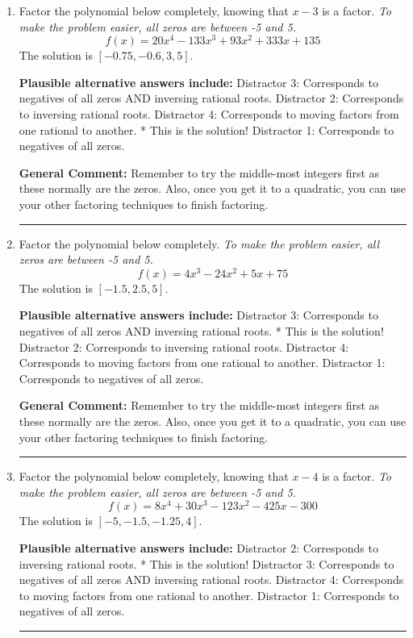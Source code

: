\documentclass{extbook}[14pt]
\newcommand{\litem}[1]{\item #1

\rule{\textwidth}{0.4pt}}
\begin{document}
\begin{enumerate}\litem{
Factor the polynomial below completely, knowing that $x -3$ is a factor. \textit{To make the problem easier, all zeros are between -5 and 5.}
\[ f(x) = 20x^{4} -133 x^{3} +93 x^{2} +333 x + 135 \]The solution is \( [-0.75, -0.6, 3, 5] \).\begin{enumerate}[label=\Alph*.]
\textbf{Plausible alternative answers include:} Distractor 3: Corresponds to negatives of all zeros AND inversing rational roots.
 Distractor 2: Corresponds to inversing rational roots.
 Distractor 4: Corresponds to moving factors from one rational to another.
* This is the solution!
 Distractor 1: Corresponds to negatives of all zeros.
\end{enumerate}

\textbf{General Comment:} Remember to try the middle-most integers first as these normally are the zeros. Also, once you get it to a quadratic, you can use your other factoring techniques to finish factoring.
}
\litem{
Factor the polynomial below completely. \textit{To make the problem easier, all zeros are between -5 and 5.}
\[ f(x) = 4x^{3} -24 x^{2} +5 x + 75 \]The solution is \( [-1.5, 2.5, 5] \).\begin{enumerate}[label=\Alph*.]
\textbf{Plausible alternative answers include:} Distractor 3: Corresponds to negatives of all zeros AND inversing rational roots.
* This is the solution!
 Distractor 2: Corresponds to inversing rational roots.
 Distractor 4: Corresponds to moving factors from one rational to another.
 Distractor 1: Corresponds to negatives of all zeros.
\end{enumerate}

\textbf{General Comment:} Remember to try the middle-most integers first as these normally are the zeros. Also, once you get it to a quadratic, you can use your other factoring techniques to finish factoring.
}
\litem{
Factor the polynomial below completely, knowing that $x -4$ is a factor. \textit{To make the problem easier, all zeros are between -5 and 5.}
\[ f(x) = 8x^{4} +30 x^{3} -123 x^{2} -425 x -300 \]The solution is \( [-5, -1.5, -1.25, 4] \).\begin{enumerate}[label=\Alph*.]
\textbf{Plausible alternative answers include:} Distractor 2: Corresponds to inversing rational roots.
* This is the solution!
 Distractor 3: Corresponds to negatives of all zeros AND inversing rational roots.
 Distractor 4: Corresponds to moving factors from one rational to another.
 Distractor 1: Corresponds to negatives of all zeros.
\end{enumerate}

}
\end{enumerate}
\end{document}
